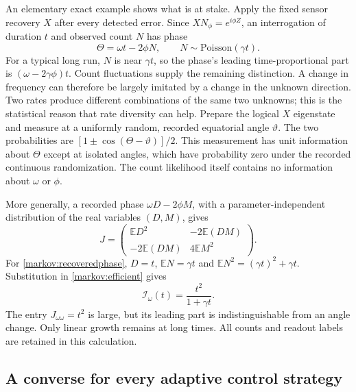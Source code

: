 \documentclass[11pt,a4paper]{article}
\numberwithin{equation}{section}
\theoremstyle{remark}
\begin{document}
An elementary exact example shows what is at stake. Apply the fixed sensor
recovery $X$ after every detected error. Since $XN_\phi=e^{i\phi Z}$, an
interrogation of duration $t$ and observed count $N$ has phase
\begin{equation}
 \Theta=\omega t-2\phi N,\qquad N\sim\mathrm{Poisson}(\gamma t).
 \label{markov:recoveredphase}
\end{equation}
For a typical long run, $N$ is near $\gamma t$, so the phase's leading
time-proportional part is $(\omega-2\gamma\phi)t$. Count fluctuations supply
the remaining distinction. A change in frequency can therefore be largely
imitated by a change in the unknown direction. Two rates produce different
combinations of the same two unknowns; this is the statistical reason that
rate diversity can help.
Prepare the logical $X$ eigenstate and measure at a uniformly random,
recorded equatorial angle $\vartheta$. The two probabilities are
$[1\pm\cos(\Theta-\vartheta)]/2$. This measurement has unit information about
$\Theta$ except at isolated angles, which have probability zero under the
recorded continuous randomization. The count likelihood itself contains no
information about $\omega$ or $\phi$.

More generally, a recorded phase $\omega D-2\phi M$, with a
parameter-independent distribution of the real variables $(D,M)$, gives
\begin{equation}
 J=\begin{pmatrix}
 \mathbb E D^2&-2\mathbb E(DM)\\
 -2\mathbb E(DM)&4\mathbb E M^2
 \end{pmatrix}.
 \label{markov:phasefim}
\end{equation}
For \eqref{markov:recoveredphase}, $D=t$,
$\mathbb E N=\gamma t$ and $\mathbb E N^2=(\gamma t)^2+\gamma t$.
Substitution in \eqref{markov:efficient} gives
\begin{equation}
 \mathcal I_\omega(t)=\frac{t^2}{1+\gamma t}.
 \label{markov:fixedattain}
\end{equation}
The entry $J_{\omega\omega}=t^2$ is large, but its leading part is
indistinguishable from an angle change. Only linear growth remains at long
times. All counts and readout labels are retained in this calculation.

\subsection{A converse for every adaptive control strategy}
\end{document}
